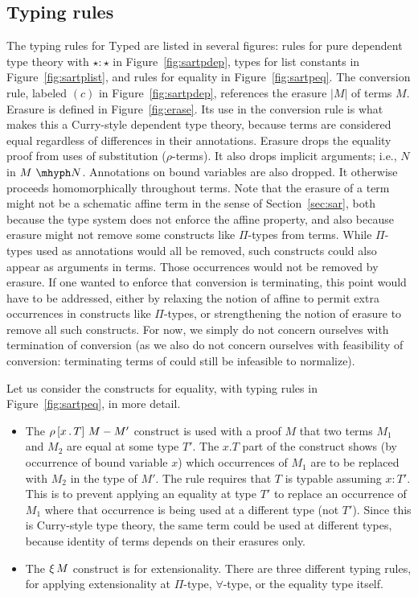 \documentclass{article}
\begin{document}
\subsection{Typing rules}

The typing rules for Typed \sar are listed in several figures: rules
for pure dependent type theory with $\star : \star$ in
Figure~\ref{fig:sartpdep}, types for list constants in
Figure~\ref{fig:sartplist}, and rules for equality in
Figure~\ref{fig:sartpeq}.  The conversion rule, labeled $(c)$ in
Figure~\ref{fig:sartpdep}, references the erasure $|M|$ of terms $M$.
Erasure is defined in Figure~\ref{fig:erase}.  Its use in the
conversion rule is what makes this a Curry-style dependent type
theory, because terms are considered equal regardless of differences
in their annotations.  Erasure drops the equality proof from uses of
substitution ($\rho$-terms).  It also drops implicit arguments; i.e.,
$N$ in $\appe{M}{N}$.  Annotations on bound variables are also
dropped.  It otherwise proceeds homomorphically throughout terms.
Note that the erasure of a term might not be a schematic affine term
in the sense of Section~\ref{sec:sar}, both because the type system
does not enforce the affine property, and also because erasure might
not remove some constructs like $\Pi$-types from terms.  While
$\Pi$-types used as annotations would all be removed, such constructs
could also appear as arguments in terms.  Those occurrences would not
be removed by erasure.  If one wanted to enforce that conversion is
terminating, this point would have to be addressed, either by relaxing
the notion of affine to permit extra occurrences in constructs like
$\Pi$-types, or strengthening the notion of erasure to remove all such
constructs.  For now, we simply do not concern ourselves with
termination of conversion (as we also do not concern ourselves with
feasibility of conversion: terminating terms of \sar could still be
infeasible to normalize).  

Let us consider the constructs for equality, with typing rules in Figure~\ref{fig:sartpeq}, in more detail.

\begin{itemize}
\item The $\rho\, [x\,.\,T]\ M - M'$ construct is used with a proof $M$ that two terms $M_1$ and $M_2$ are
  equal at some type $T'$.  The $x.T$ part of the construct shows (by occurrence of bound variable $x$)
  which occurrences of $M_1$ are to
  be replaced with $M_2$ in the type of $M'$.  The rule requires that $T$ is typable assuming $x : T'$.
  This is to prevent applying an equality at type $T'$ to replace an occurrence of $M_1$ where that
  occurrence is being used at a different type (not $T'$).  Since this is Curry-style type theory,
  the same term could be used at different types, because identity of terms depends on their erasures only.
\item The $\xi\, M$ construct is for extensionality.  There are three different typing rules,
  for applying extensionality at $\Pi$-type, $\forall$-type, or the equality type itself.
\end{itemize}
\end{document}
